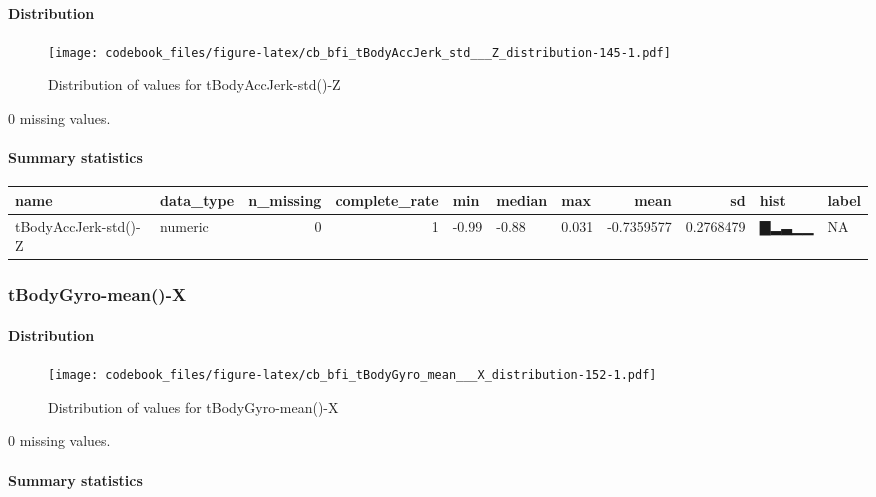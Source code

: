 \documentclass[
]{article}
\begin{document}
\hypertarget{tBodyAccJerk_std___Z_distribution}{%
\paragraph{Distribution}\label{tBodyAccJerk_std___Z_distribution}}

\begin{figure}
\centering
\texttt{[image: codebook\_files/figure-latex/cb\_bfi\_tBodyAccJerk\_std\_\_\_Z\_distribution-145-1.pdf]}
\caption{Distribution of values for tBodyAccJerk-std()-Z}
\end{figure}

0 missing values.

\hypertarget{tBodyAccJerk_std___Z_summary}{%
\paragraph{Summary statistics}\label{tBodyAccJerk_std___Z_summary}}

\begin{longtable}[]{@{}llrrlllrrll@{}}
\toprule
name & data\_type & n\_missing & complete\_rate & min & median & max &
mean & sd & hist & label \\
\midrule
\endhead
tBodyAccJerk-std()-Z & numeric & 0 & 1 & -0.99 & -0.88 & 0.031 &
-0.7359577 & 0.2768479 & ▇▂▃▁▁ & NA \\
\bottomrule
\end{longtable}

\hypertarget{tBodyGyro_mean___X}{%
\subsubsection{tBodyGyro-mean()-X}\label{tBodyGyro_mean___X}}

\hypertarget{tBodyGyro_mean___X_distribution}{%
\paragraph{Distribution}\label{tBodyGyro_mean___X_distribution}}

\begin{figure}
\centering
\texttt{[image: codebook\_files/figure-latex/cb\_bfi\_tBodyGyro\_mean\_\_\_X\_distribution-152-1.pdf]}
\caption{Distribution of values for tBodyGyro-mean()-X}
\end{figure}

0 missing values.

\hypertarget{tBodyGyro_mean___X_summary}{%
\paragraph{Summary statistics}\label{tBodyGyro_mean___X_summary}}
\end{document}
